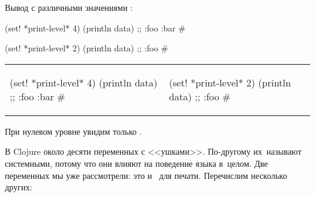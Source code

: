 \noindentnarrow
Вывод с различными значениями :

\ifnarrow

\begin{clojure}
(set! *print-level* 4)
(println data)
;; {:foo {:bar #}}
\end{clojure}

\splitter

\begin{clojure}
(set! *print-level* 2)
(println data)
;; {:foo #}
\end{clojure}

\else

\noindent
\begin{tabular}{ @{}p{5cm} @{}p{5cm} }

\begin{clojure}
(set! *print-level* 4)
(println data)
;; {:foo {:bar #}}
\end{clojure}

&

\begin{clojure}
(set! *print-level* 2)
(println data)
;; {:foo #}
\end{clojure}

\end{tabular}

\fi

\noindent
При нулевом уровне увидим только \code{\#}.

В Clojure около десяти переменных с <<ушками>>. По-другому их~называют
системными, потому что они влияют на поведение языка в~целом. Две переменных мы
уже рассмотрели: это  и~ для
печати. Перечислим несколько других:


